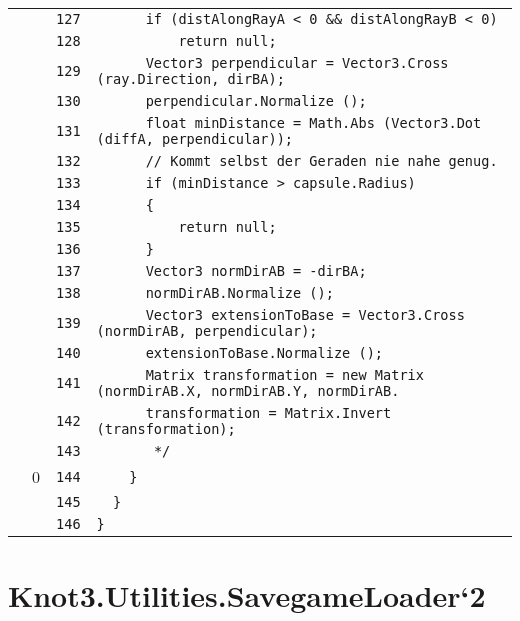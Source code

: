 \documentclass[a4paper,10pt]{article}
\begin{document}
\begin{longtable}[l]{lrrl}
\cellcolor{gray} &  & \verb~127~ & \verb~      if (distAlongRayA < 0 && distAlongRayB < 0)~\\
\cellcolor{gray} &  & \verb~128~ & \verb~          return null;~\\
\cellcolor{gray} &  & \verb~129~ & \verb~      Vector3 perpendicular = Vector3.Cross (ray.Direction, dirBA);~\\
\cellcolor{gray} &  & \verb~130~ & \verb~      perpendicular.Normalize ();~\\
\cellcolor{gray} &  & \verb~131~ & \verb~      float minDistance = Math.Abs (Vector3.Dot (diffA, perpendicular));~\\
\cellcolor{gray} &  & \verb~132~ & \verb~      // Kommt selbst der Geraden nie nahe genug.~\\
\cellcolor{gray} &  & \verb~133~ & \verb~      if (minDistance > capsule.Radius)~\\
\cellcolor{gray} &  & \verb~134~ & \verb~      {~\\
\cellcolor{gray} &  & \verb~135~ & \verb~          return null;~\\
\cellcolor{gray} &  & \verb~136~ & \verb~      }~\\
\cellcolor{gray} &  & \verb~137~ & \verb~      Vector3 normDirAB = -dirBA;~\\
\cellcolor{gray} &  & \verb~138~ & \verb~      normDirAB.Normalize ();~\\
\cellcolor{gray} &  & \verb~139~ & \verb~      Vector3 extensionToBase = Vector3.Cross (normDirAB, perpendicular);~\\
\cellcolor{gray} &  & \verb~140~ & \verb~      extensionToBase.Normalize ();~\\
\cellcolor{gray} &  & \verb~141~ & \verb~      Matrix transformation = new Matrix (normDirAB.X, normDirAB.Y, normDirAB.~\\
\cellcolor{gray} &  & \verb~142~ & \verb~      transformation = Matrix.Invert (transformation);~\\
\cellcolor{gray} &  & \verb~143~ & \verb~       */~\\
\cellcolor{red} & 0 & \verb~144~ & \verb~    }~\\
\cellcolor{gray} &  & \verb~145~ & \verb~  }~\\
\cellcolor{gray} &  & \verb~146~ & \verb~}~\\
\end{longtable}
\newpage
\section{Knot3.Utilities.SavegameLoader`2}
\end{document}
